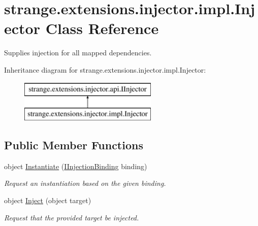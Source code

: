 \hypertarget{classstrange_1_1extensions_1_1injector_1_1impl_1_1_injector}{\section{strange.\-extensions.\-injector.\-impl.\-Injector Class Reference}
\label{classstrange_1_1extensions_1_1injector_1_1impl_1_1_injector}
}


Supplies injection for all mapped dependencies.  


Inheritance diagram for strange.\-extensions.\-injector.\-impl.\-Injector\-:\begin{figure}[H]
\begin{center}
\leavevmode
\includegraphics[height=2.000000cm]{classstrange_1_1extensions_1_1injector_1_1impl_1_1_injector}
\end{center}
\end{figure}
\subsection*{Public Member Functions}
\begin{DoxyCompactItemize}
\item 
object \hyperlink{classstrange_1_1extensions_1_1injector_1_1impl_1_1_injector_af2e993fb61630c887d378d36b19bac6f}{Instantiate} (\hyperlink{interfacestrange_1_1extensions_1_1injector_1_1api_1_1_i_injection_binding}{I\-Injection\-Binding} binding)
\begin{DoxyCompactList}\small\item\em Request an instantiation based on the given binding. \end{DoxyCompactList}\item 
\hypertarget{classstrange_1_1extensions_1_1injector_1_1impl_1_1_injector_a8e68bee15edd6eae305e1e2a4f24ff6c}{object \hyperlink{classstrange_1_1extensions_1_1injector_1_1impl_1_1_injector_a8e68bee15edd6eae305e1e2a4f24ff6c}{Inject} (object target)}\label{classstrange_1_1extensions_1_1injector_1_1impl_1_1_injector_a8e68bee15edd6eae305e1e2a4f24ff6c}

\begin{DoxyCompactList}\small\item\em Request that the provided target be injected. \end{DoxyCompactList}\end{DoxyCompactItemize}
